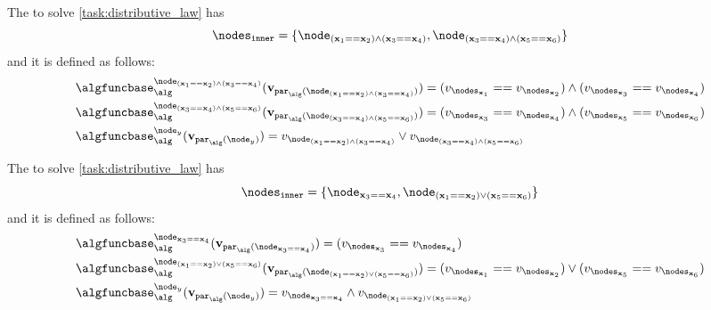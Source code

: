 \begin{causalgraph}\label{alg:AndOrAnd}
    The  to solve \cref{task:distributive_law} has 
    \[\nodesinner=\{\node_{(\bx_1\isequal\bx_2)\land(\bx_3\isequal\bx_4)}, \node_{(\bx_3\isequal\bx_4)\land(\bx_5\isequal\bx_6)}\}\]
    and it is defined as follows:
    \begin{align}
        &\algfuncnode{\node_{(\bx_1\isequal\bx_2)\land(\bx_3\isequal\bx_4)}}(\nodesvalues_{\parents(\node_{(\bx_1\isequal\bx_2)\land(\bx_3\isequal\bx_4)})}) = 
        (\nodevalue_{\nodes_{\bx_1}} \isequal \nodevalue_{\nodes_{\bx_2}}) \land (\nodevalue_{\nodes_{\bx_3}} \isequal \nodevalue_{\nodes_{\bx_4}}) \nonumber\\
        &\algfuncnode{\node_{(\bx_3\isequal\bx_4)\land(\bx_5\isequal\bx_6)}}(\nodesvalues_{\parents(\node_{(\bx_3\isequal\bx_4)\land(\bx_5\isequal\bx_6)})}) = 
        (\nodevalue_{\nodes_{\bx_3}} \isequal \nodevalue_{\nodes_{\bx_4}}) \land (\nodevalue_{\nodes_{\bx_5}} \isequal \nodevalue_{\nodes_{\bx_6}}) \nonumber\\
        &\algfuncnode{\node_{y}}(\nodesvalues_{\parents(\node_{y})}) =
        \nodevalue_{\node_{(\bx_1\isequal\bx_2)\land(\bx_3\isequal\bx_4)}} \lor \nodevalue_{\node_{(\bx_3\isequal\bx_4)\land(\bx_5\isequal\bx_6)}}\nonumber
    \end{align}
\end{causalgraph}
\begin{causalgraph}\label{alg:AndOr}
    The  to solve \cref{task:distributive_law} has 
    \[\nodesinner=\{\node_{\bx_3\isequal\bx_4}, \node_{(\bx_1\isequal\bx_2)\lor(\bx_5\isequal\bx_6)}\}\]
    and it is defined as follows:
    \begin{align}
        &\algfuncnode{\node_{\bx_3\isequal\bx_4}}(\nodesvalues_{\parents(\node_{\bx_3\isequal\bx_4})}) = 
        (\nodevalue_{\nodes_{\bx_3}} \isequal \nodevalue_{\nodes_{\bx_4}}) \nonumber\\
        &\algfuncnode{\node_{(\bx_1\isequal\bx_2)\lor(\bx_5\isequal\bx_6)}}(\nodesvalues_{\parents(\node_{(\bx_1\isequal\bx_2)\lor(\bx_5\isequal\bx_6)})}) = 
        (\nodevalue_{\nodes_{\bx_1}} \isequal \nodevalue_{\nodes_{\bx_2}}) \lor (\nodevalue_{\nodes_{\bx_5}} \isequal \nodevalue_{\nodes_{\bx_6}}) \nonumber\\
        &\algfuncnode{\node_{y}}(\nodesvalues_{\parents(\node_{y})}) =
        \nodevalue_{\node_{\bx_3\isequal\bx_4}} \land \nodevalue_{\node_{(\bx_1\isequal\bx_2)\lor(\bx_5\isequal\bx_6)}}\nonumber
    \end{align}
\end{causalgraph}

